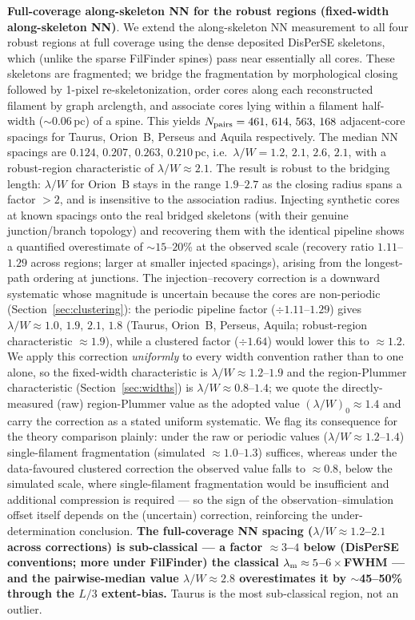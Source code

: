 \documentclass[usenatbib,twoside,twocolumn]{mnras}
\begin{document}
\textbf{Full-coverage along-skeleton NN for the robust regions (fixed-width along-skeleton NN)}. We extend the along-skeleton NN measurement to all four robust regions at full coverage using the dense deposited DisPerSE skeletons, which (unlike the sparse FilFinder spines) pass near essentially all cores. These skeletons are fragmented; we bridge the fragmentation by morphological closing followed by 1-pixel re-skeletonization, order cores along each reconstructed filament by graph arclength, and associate cores lying within a filament half-width ($\sim$0.06\,pc) of a spine. This yields $N_{\rm pairs} = 461,\,614,\,563,\,168$ adjacent-core spacings for Taurus, Orion~B, Perseus and Aquila respectively. The median NN spacings are $0.124,\,0.207,\,0.263,\,0.210$\,pc, i.e.\ $\lambda/W = 1.2,\,2.1,\,2.6,\,2.1$, with a robust-region characteristic of $\lambda/W \approx 2.1$. The result is robust to the bridging length: $\lambda/W$ for Orion~B stays in the range $1.9$--$2.7$ as the closing radius spans a factor $>2$, and is insensitive to the association radius. Injecting synthetic cores at known spacings onto the real bridged skeletons (with their genuine junction/branch topology) and recovering them with the identical pipeline shows a quantified overestimate of $\sim$$15$--$20$\% at the observed scale (recovery ratio $1.11$--$1.29$ across regions; larger at smaller injected spacings), arising from the longest-path ordering at junctions. The injection--recovery correction is a downward systematic whose magnitude is uncertain because the cores are non-periodic (Section~\ref{sec:clustering}): the periodic pipeline factor ($\div1.11$--$1.29$) gives $\lambda/W\approx1.0,\,1.9,\,2.1,\,1.8$ (Taurus, Orion~B, Perseus, Aquila; robust-region characteristic $\approx1.9$), while a clustered factor ($\div1.64$) would lower this to $\approx1.2$. We apply this correction \emph{uniformly} to every width convention rather than to one alone, so the fixed-width characteristic is $\lambda/W\approx1.2$--$1.9$ and the region-Plummer characteristic (Section~\ref{sec:widths}) is $\lambda/W\approx0.8$--$1.4$; we quote the directly-measured (raw) region-Plummer value as the adopted value $(\lambda/W)_0\approx1.4$ and carry the correction as a stated uniform systematic. We flag its consequence for the theory comparison plainly: under the raw or periodic values ($\lambda/W\approx1.2$--$1.4$) single-filament fragmentation (simulated $\approx1.0$--$1.3$) suffices, whereas under the data-favoured clustered correction the observed value falls to $\approx0.8$, below the simulated scale, where single-filament fragmentation would be insufficient and additional compression is required --- so the sign of the observation--simulation offset itself depends on the (uncertain) correction, reinforcing the under-determination conclusion. \textbf{The full-coverage NN spacing ($\lambda/W\approx1.2$--$2.1$ across corrections) is sub-classical --- a factor $\approx3$--$4$ below (DisPerSE conventions; more under FilFinder) the classical $\lambda_{\rm m}\approx5$--$6\times$FWHM --- and the pairwise-median value $\lambda/W\approx2.8$ overestimates it by $\sim$45--50\% through the $L/3$ extent-bias.} Taurus is the most sub-classical region, not an outlier.
\end{document}
